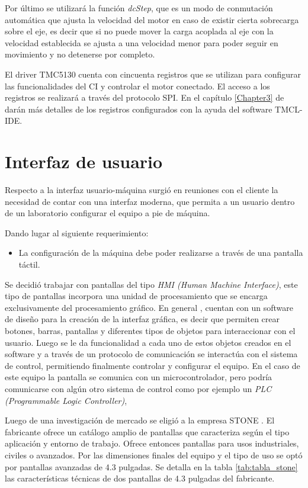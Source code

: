 Por último se utilizará la función \textit{dcStep}, que es un modo de conmutación automática que ajusta la velocidad del motor en caso de existir cierta sobrecarga sobre el eje, es decir que si no puede mover la carga acoplada al eje con la velocidad establecida se ajusta a una velocidad menor para poder seguir en movimiento y no detenerse por completo. 


El driver TMC5130 cuenta con cincuenta registros que se utilizan para configurar las funcionalidades del CI y controlar el motor conectado. El acceso a los registros se realizará a través del protocolo SPI. En el capítulo \ref{Chapter3} de darán más detalles de los registros configurados con la ayuda del software TMCL-IDE.  


\section{Interfaz de usuario}

Respecto a la interfaz usuario-máquina surgió en reuniones con el cliente la necesidad de contar con una interfaz moderna, que permita a un usuario dentro de un laboratorio configurar el equipo a pie de máquina. 

Dando lugar al siguiente requerimiento:
\begin{itemize}
\item La configuración de la máquina debe poder realizarse a través de una pantalla táctil.	
\end{itemize} 

Se decidió trabajar con pantallas del tipo \textit{HMI (Human Machine Interface)}, este tipo de pantallas incorpora una unidad de procesamiento que se encarga exclusivamente del procesamiento gráfico. En general , cuentan con un software de diseño para la creación de la interfaz gráfica, es decir que permiten crear botones, barras, pantallas y diferentes tipos de objetos para interaccionar con el usuario. Luego se le da funcionalidad a cada uno de estos objetos creados en el software y a través de un protocolo de comunicación se interactúa con el sistema de control, permitiendo finalmente controlar y configurar el equipo. En el caso de este equipo la pantalla se comunica con un microcontrolador, pero  podría  comunicarse con algún otro sistema de control como por ejemplo un  \textit{PLC (Programmable Logic Controller)}, 
 

Luego de una investigación de mercado se eligió a la empresa STONE \citep{web_stone}. El fabricante ofrece un catálogo amplio de pantallas que caracteriza según el tipo aplicación y entorno de trabajo. Ofrece entonces pantallas para usos industriales, civiles o avanzados. Por las dimensiones finales del equipo y el tipo de uso se optó por pantallas avanzadas de 4.3 pulgadas. Se detalla en la tabla \ref{tab:tabla_stone} las características técnicas de dos pantallas de 4.3 pulgadas del fabricante.

